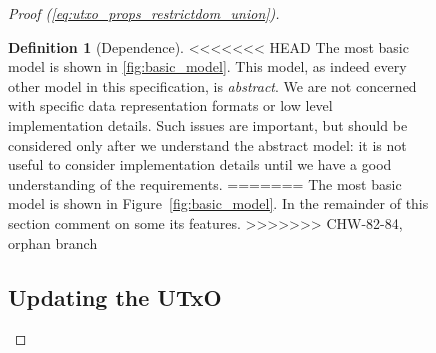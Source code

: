 \documentclass{article}
\theoremstyle{definition}{
  \newtheorem{lemma}{Lemma}[section] %
  \newtheorem{definition}[lemma]{Definition}
}
\theoremstyle{theorem}{
  \newtheorem{invariant}[lemma]{Invariant}
  \newtheorem{proofobligation}[lemma]{Proof Obligation}
}
\newtheorem{definition}[lemma]{Definition}
\numberwithin{equation}{lemma}
\begin{document}
\begin{figure}
\begin{proof}[Proof (\eqref{eq:utxo_props_restrictdom_union})]
\begin{definition}[Dependence]
<<<<<<< HEAD
The most basic model is shown in \cref{fig:basic_model}. This model, as
indeed every other model in this specification, is \emph{abstract}. We are not
concerned with specific data representation formats or low level implementation
details. Such issues are important, but should be considered only after we
understand the abstract model: it is not useful to consider implementation
details until we have a good understanding of the requirements.
=======
The most basic model is shown in Figure~\ref{fig:basic_model}. In the remainder of
this section comment on some its features.
>>>>>>> CHW-82-84, orphan branch

\subsection{Updating the UTxO}


\end{definition}
\end{proof}
\end{figure}
\end{document}

